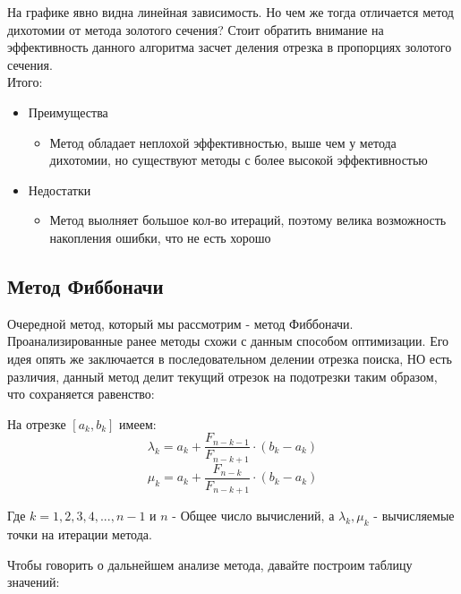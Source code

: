 \documentclass[a4paper, 14pt]{article}
\begin{document}
	На графике явно видна линейная зависимость. Но чем же тогда отличается метод дихотомии от метода золотого сечения? Стоит обратить внимание на эффективность данного алгоритма засчет деления отрезка в пропорциях золотого сечения. \\
	 Итого: 
	\begin{itemize}
		\item Преимущества
			\begin{itemize}
				\item Метод обладает неплохой эффективностью, выше чем у метода дихотомии, но существуют методы с более высокой эффективностью
			\end{itemize}
		\item Недостатки
			\begin{itemize}
			\item Метод выолняет большое кол-во итераций, поэтому велика возможность накопления ошибки, что не есть хорошо
			\end{itemize}
	\end{itemize}
	
	\subsection*{Метод Фиббоначи}
	Очередной метод, который мы рассмотрим - метод Фиббоначи. Проанализированные ранее методы схожи с данным способом оптимизации. Его идея опять же заключается в последовательном делении отрезка поиска, НО есть различия, данный метод делит текущий отрезок на подотрезки таким образом, что сохраняется равенство:
	
	
	На отрезке $[a_k, b_k]$ имеем: 
	\[
	\lambda_k = a_k + \frac{F_{n - k - 1}}{F_{n - k + 1}} \cdot (b_k - a_k)\]\[
	\mu_k = a_k + \frac{F_{n - k}}{F_{n - k + 1}} \cdot (b_k - a_k)
	\]
	
 Где $k = 1, 2, 3, 4, ..., n - 1 $ и $n$ - Общее число вычислений, а $\lambda_k, \mu_k$ - вычисляемые точки на итерации метода. 
 
Чтобы говорить о дальнейшем анализе метода, давайте построим таблицу значений: \\
\end{document}
